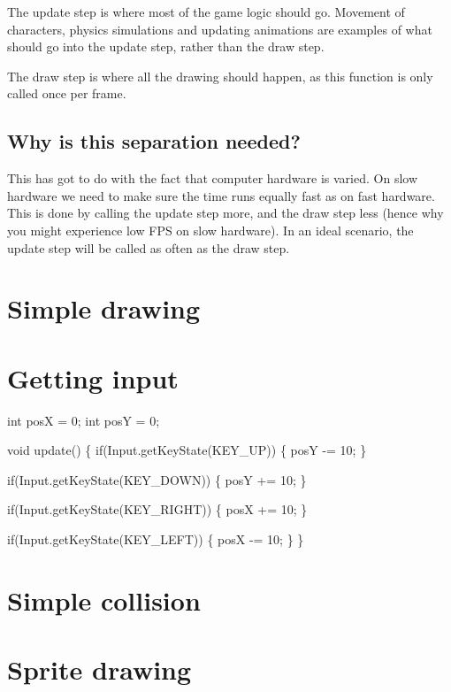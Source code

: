 The update step is where most of the game logic should go. Movement of characters, physics simulations and updating animations are examples of what should go into the update step, rather than the draw step.

The draw step is where all the drawing should happen, as this function is only called once per frame.\hypertarget{gameloop_why_step}{}\subsection{Why is this separation needed?}\label{gameloop_why_step}
This has got to do with the fact that computer hardware is varied. On slow hardware we need to make sure the time runs equally fast as on fast hardware. This is done by calling the update step more, and the draw step less (hence why you might experience low F\+P\+S on slow hardware). In an ideal scenario, the update step will be called as often as the draw step. \hypertarget{drawing}{}\section{Simple drawing}\label{drawing}
\hypertarget{input}{}\section{Getting input}\label{input}

\begin{DoxyCode}
\textcolor{keywordtype}{int} posX = 0;
\textcolor{keywordtype}{int} posY = 0;

\textcolor{keywordtype}{void} update()
\{
    \textcolor{keywordflow}{if}(Input.getKeyState(KEY\_UP))
    \{
        posY -= 10;
    \}

    \textcolor{keywordflow}{if}(Input.getKeyState(KEY\_DOWN))
    \{
        posY += 10;
    \}

    \textcolor{keywordflow}{if}(Input.getKeyState(KEY\_RIGHT))
    \{
        posX += 10;
    \}

    \textcolor{keywordflow}{if}(Input.getKeyState(KEY\_LEFT))
    \{
        posX -= 10;
    \}
\}
\end{DoxyCode}
 \hypertarget{collision}{}\section{Simple collision}\label{collision}
\hypertarget{sprites}{}\section{Sprite drawing}\label{sprites}
